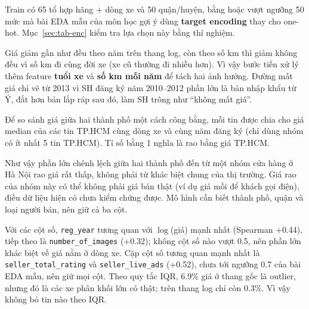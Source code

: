 
Train có 65 tổ hợp hãng + dòng xe và 50 quận/huyện, bằng hoặc vượt ngưỡng 50 mức mà bài EDA mẫu của môn học gợi ý dùng
\textbf{target encoding} thay cho one-hot. Mục~\ref{sec:tab-enc} kiểm tra lựa chọn này bằng thí nghiệm.


Giá giảm gần như đều theo năm trên thang log, còn theo số km thì giảm không đều vì số km đi cùng đời xe (xe cũ thường đi
nhiều hơn). Vì vậy bước tiền xử lý thêm feature \textbf{tuổi xe} và \textbf{số km mỗi năm} để tách hai ảnh hưởng. Đường
mất giá chỉ vẽ từ 2013 vì SH đăng ký năm 2010--2012 phần lớn là bản nhập khẩu từ Ý, đắt hơn bản lắp ráp sau đó, làm SH
trông như ``không mất giá''.

Để so sánh giá giữa hai thành phố một cách công bằng, mỗi tin được chia cho giá median của các tin TP.HCM cùng dòng xe
và cùng năm đăng ký (chỉ dùng nhóm có ít nhất 5 tin TP.HCM). Tỉ số bằng 1 nghĩa là rao bằng giá TP.HCM.


Như vậy phần lớn chênh lệch giữa hai thành phố đến từ một nhóm cửa hàng ở Hà Nội rao giá rất thấp, không phải từ khác
biệt chung của thị trường. Giá rao của nhóm này có thể không phải giá bán thật (ví dụ giá mồi để khách gọi điện), điều
dữ liệu hiện có chưa kiểm chứng được. Mô hình cần biết thành phố, quận và loại người bán, nên giữ cả ba cột.

Với các cột số, \texttt{reg\_year} tương quan với $\log$(giá) mạnh nhất (Spearman +0.44), tiếp theo là
\texttt{number\_of\_images} (+0.32); không cột số nào vượt 0.5, nên phần lớn khác biệt về giá nằm ở dòng xe. Cặp cột số
tương quan mạnh nhất là \texttt{seller\_total\_rating} và \texttt{seller\_live\_ads} (+0.52), chưa tới ngưỡng 0.7 của bài
EDA mẫu, nên giữ mọi cột. Theo quy tắc IQR, 6.9\% giá ở thang gốc là outlier, nhưng đó là các xe phân khối lớn có thật;
trên thang log chỉ còn 0.3\%. Vì vậy không bỏ tin nào theo IQR.

